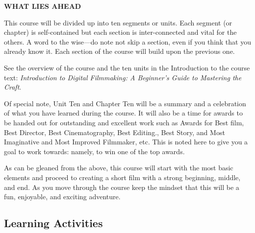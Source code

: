 \documentclass[
]{book}
\begin{document}
\textbf{WHAT LIES AHEAD}

This course will be divided up into ten segments or units. Each segment (or chapter) is self-contained but each section is inter-connected and vital for the others. A word to the wise---do note not skip a section, even if you think that you already know it. Each section of the course will build upon the previous one.

See the overview of the course and the ten units in the Introduction to the course text: \emph{Introduction to Digital Filmmaking: A Beginner's Guide to Mastering the Craft}.

Of special note, Unit Ten and Chapter Ten will be a summary and a celebration of what you have learned during the course. It will also be a time for awards to be handed out for outstanding and excellent work such as Awards for Best film, Best Director, Best Cinematography, Best Editing., Best Story, and Most Imaginative and Most Improved Filmmaker, etc. This is noted here to give you a goal to work towards: namely, to win one of the top awards.

As can be gleaned from the above, this course will start with the most basic elements and proceed to creating a short film with a strong beginning, middle, and end. As you move through the course keep the mindset that this will be a fun, enjoyable, and exciting adventure.

\hypertarget{learning-activities}{%
\subsection*{Learning Activities}\label{learning-activities}}
\end{document}
